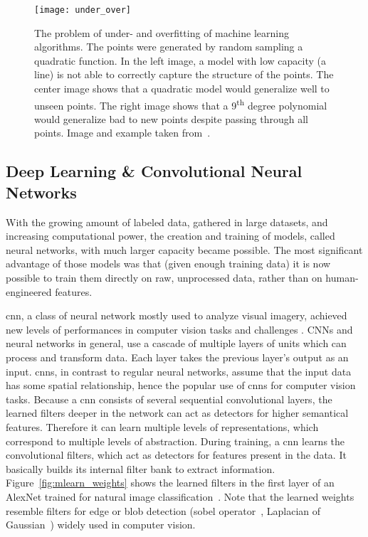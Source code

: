 \begin{figure}[htbp]
    \centering
	\texttt{[image: under\_over]}
    \caption[Under- and Overfitting]{The problem of under- and overfitting of machine learning algorithms. The points were generated by random sampling a quadratic function. In the left image, a model with low capacity (a line) is not able to correctly capture the structure of the points. The center image shows that a quadratic model would generalize well to unseen points. The right image shows that a 9\textsuperscript{th} degree polynomial would generalize bad to new points despite passing through all points. Image and example taken from~\cite{Goodfellow2016DeepLearning}.}
    \label{fig:under_over_fitting}
\end{figure}

\subsection{Deep Learning \& Convolutional Neural Networks} \label{sec:mlearn_nn_and_cnn}
With the growing amount of labeled data, gathered in large datasets, and increasing computational power, the creation and training of models, called neural networks, with much larger capacity became possible. The most significant advantage of those models was that (given enough training data) it is now possible to train them directly on raw, unprocessed data, rather than on human-engineered features.

\gls{cnn}, a class of neural network mostly used to analyze visual imagery, achieved new levels of performances in computer vision tasks and challenges \cite{Krizhevsky2012ImageNetNetworks,Simonyan2014VeryRecognition,Szegedy2014GoingConvolutions,He2015DeepRecognition,Zeiler2014VisualizingNetworks}. 
CNNs and neural networks in general, use a cascade of multiple layers of units which can process and transform data. Each layer takes the previous layer's output as an input. \gls{cnn}s, in contrast to regular neural networks, assume that the input data has some spatial relationship, hence the popular use of \gls{cnn}s for computer vision tasks. Because a \gls{cnn} consists of several sequential convolutional layers, the learned filters deeper in the network can act as detectors for higher semantical features. Therefore it can learn multiple levels of representations, which correspond to multiple levels of abstraction. During training, a \gls{cnn} learns the convolutional filters, which act as detectors for features present in the data. It basically builds its internal filter bank to extract information. Figure~\ref{fig:mlearn_weights} shows the learned filters in the first layer of an AlexNet trained for natural image classification~\cite{Russakovsky2015ImageNetChallenge}. Note that the learned weights resemble filters for edge or blob detection (sobel operator~\cite{Sobel1990AnOperator}, Laplacian of Gaussian~\cite{Marr187}) widely used in computer vision.

